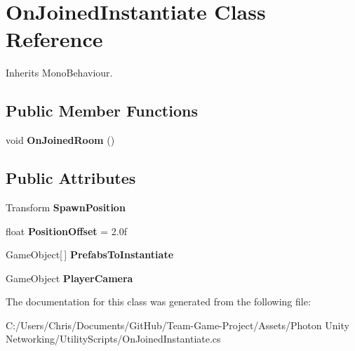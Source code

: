 \hypertarget{class_on_joined_instantiate}{}\section{On\+Joined\+Instantiate Class Reference}
\label{class_on_joined_instantiate}


Inherits Mono\+Behaviour.

\subsection*{Public Member Functions}
\begin{DoxyCompactItemize}
\item 
void {\bfseries On\+Joined\+Room} ()\hypertarget{class_on_joined_instantiate_ad0c97d890632de549b835a46204e2339}{}\label{class_on_joined_instantiate_ad0c97d890632de549b835a46204e2339}

\end{DoxyCompactItemize}
\subsection*{Public Attributes}
\begin{DoxyCompactItemize}
\item 
Transform {\bfseries Spawn\+Position}\hypertarget{class_on_joined_instantiate_aa263e65b49298aaf137c2de1bf8e2414}{}\label{class_on_joined_instantiate_aa263e65b49298aaf137c2de1bf8e2414}

\item 
float {\bfseries Position\+Offset} = 2.\+0f\hypertarget{class_on_joined_instantiate_a5c87d1af9e4da3d06e67879299492743}{}\label{class_on_joined_instantiate_a5c87d1af9e4da3d06e67879299492743}

\item 
Game\+Object\mbox{[}$\,$\mbox{]} {\bfseries Prefabs\+To\+Instantiate}\hypertarget{class_on_joined_instantiate_a2a93970211d73e8110535c65f10e4631}{}\label{class_on_joined_instantiate_a2a93970211d73e8110535c65f10e4631}

\item 
Game\+Object {\bfseries Player\+Camera}\hypertarget{class_on_joined_instantiate_a2b51d7c4fe95905cabe75bc8b8cb774c}{}\label{class_on_joined_instantiate_a2b51d7c4fe95905cabe75bc8b8cb774c}

\end{DoxyCompactItemize}


The documentation for this class was generated from the following file\+:\begin{DoxyCompactItemize}
\item 
C\+:/\+Users/\+Chris/\+Documents/\+Git\+Hub/\+Team-\/\+Game-\/\+Project/\+Assets/\+Photon Unity Networking/\+Utility\+Scripts/On\+Joined\+Instantiate.\+cs\end{DoxyCompactItemize}
